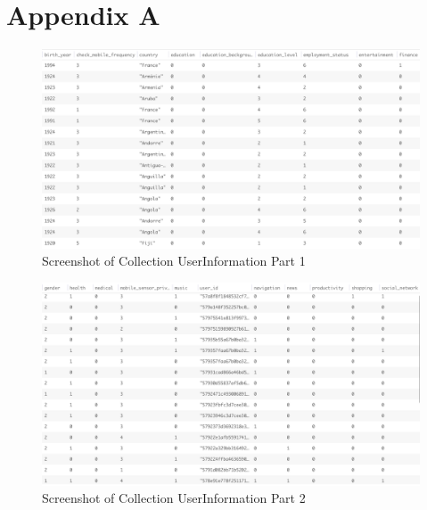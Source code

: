 \chapter{Appendix A}

\begin{figure}[ht!]
\centering
\includegraphics[width=\textwidth,keepaspectratio,height=0.6\textwidth]{./images/collection_ui_1}
\caption{Screenshot of Collection UserInformation Part 1}
\label{fig:col_ui_1}
\end{figure}

\begin{figure}[ht!]
\centering
\includegraphics[width=\textwidth,keepaspectratio,height=0.6\textwidth]{./images/collection_ui_2}
\caption{Screenshot of Collection UserInformation Part 2}
\label{fig:col_ui_2}
\end{figure}


